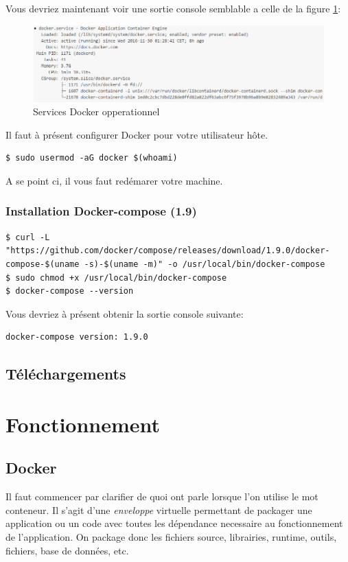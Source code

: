 Vous devriez maintenant voir une sortie console semblable a celle de la figure \ref{fig:dockerservices}:

\begin{figure}[H] 
\centering 
\includegraphics[width=1\columnwidth]{img/docker-services} 
\caption[docker services]{Services Docker opperationnel}
\label{fig:dockerservices} 
\end{figure}

Il faut à présent configurer Docker pour votre utilisateur hôte.

\begin{lstlisting}[frame=single]
$ sudo usermod -aG docker $(whoami)
\end{lstlisting}

A se point ci, il vous faut redémarer votre machine.

\subsubsection{Installation Docker-compose (1.9)}

\begin{lstlisting}[frame=single]
$ curl -L "https://github.com/docker/compose/releases/download/1.9.0/docker-compose-$(uname -s)-$(uname -m)" -o /usr/local/bin/docker-compose
$ sudo chmod +x /usr/local/bin/docker-compose
$ docker-compose --version
\end{lstlisting}

Vous devriez à présent obtenir la sortie console suivante:
\begin{lstlisting}[frame=single]
docker-compose version: 1.9.0
\end{lstlisting}

\subsection{Téléchargements}

\section{Fonctionnement}
\subsection{Docker}
Il faut commencer par clarifier de quoi ont parle lorsque l'on utilise le mot conteneur. Il s'agit d'une \emph{enveloppe} virtuelle permettant de packager une application ou un code avec toutes les dépendance necessaire au fonctionnement de l'application. On package donc les fichiers source, librairies, runtime, outils, fichiers, base de données, etc. 

